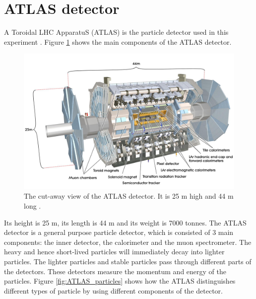 \section{ATLAS detector}
\label{sec:detector_ATLAS}

A Toroidal LHC ApparatuS (ATLAS) is the particle detector used in this experiment \cite{ATLAS_doc}.
Figure \ref{fig:detector_ATLAS} shows the main components of the ATLAS detector.
\begin{figure}
\centering
\includegraphics[width=\textwidth]{data/photo/detector/ATLAS.jpg}
\caption{The cut-away view of the ATLAS detector. It is 25 m high and 44 m long \cite{ATLAS_photo}.}
\label{fig:detector_ATLAS}
\end{figure}
Its height is 25 m, its length is 44 m and its weight is 7000 tonnes.
The ATLAS detector is a general purpose particle detector, which is consisted of 3 main components: the inner detector, the calorimeter and the muon spectrometer.
The heavy and hence short-lived particles will immediately decay into lighter particles.
The lighter particles and stable particles pass through different parts of the detectors.
These detectors measure the momentum and energy of the particles.
Figure \ref{fig:ATLAS_particles} shows how the ATLAS distinguishes different types of particle by using different components of the detector.
